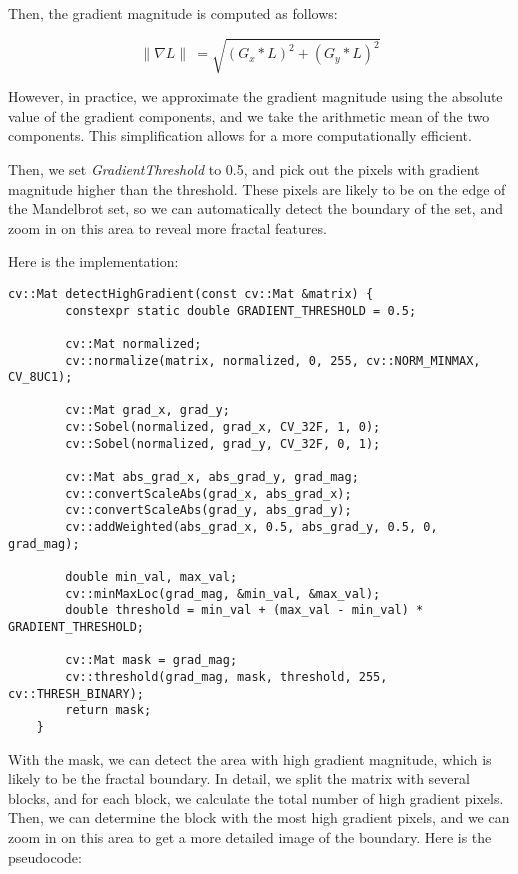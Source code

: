 Then, the gradient magnitude is computed as follows:

\begin{equation}
    \label{eq:gradient_magnitude}
    \parallel \nabla L \parallel \ = \sqrt{(G_x * L)^2 + (G_y * L)^2}
\end{equation}

However, in practice, we approximate the gradient magnitude using the absolute value of the gradient components, and
we take the arithmetic mean of the two components.
This simplification allows for a more computationally efficient.

Then, we set \textit{GradientThreshold}
to 0.5, and pick out the pixels with gradient magnitude higher than the threshold.
These pixels are likely to be on the edge of the Mandelbrot set, so we can automatically detect the boundary of the
set, and zoom in on this area to reveal more fractal features.

Here is the implementation:

\begin{lstlisting}[label={lst:detect_high_gradient}, gobble=4]
    cv::Mat detectHighGradient(const cv::Mat &matrix) {
        constexpr static double GRADIENT_THRESHOLD = 0.5;

        cv::Mat normalized;
        cv::normalize(matrix, normalized, 0, 255, cv::NORM_MINMAX, CV_8UC1);

        cv::Mat grad_x, grad_y;
        cv::Sobel(normalized, grad_x, CV_32F, 1, 0);
        cv::Sobel(normalized, grad_y, CV_32F, 0, 1);

        cv::Mat abs_grad_x, abs_grad_y, grad_mag;
        cv::convertScaleAbs(grad_x, abs_grad_x);
        cv::convertScaleAbs(grad_y, abs_grad_y);
        cv::addWeighted(abs_grad_x, 0.5, abs_grad_y, 0.5, 0, grad_mag);

        double min_val, max_val;
        cv::minMaxLoc(grad_mag, &min_val, &max_val);
        double threshold = min_val + (max_val - min_val) * GRADIENT_THRESHOLD;

        cv::Mat mask = grad_mag;
        cv::threshold(grad_mag, mask, threshold, 255, cv::THRESH_BINARY);
        return mask;
    }
\end{lstlisting}

With the mask, we can detect the area with high gradient magnitude, which is likely to be the fractal boundary.
In detail, we split the matrix with several blocks, and for each block, we calculate the total number of high
gradient pixels.
Then, we can determine the block with the most high gradient pixels, and we can zoom in on this area to get a more
detailed image of the boundary.
Here is the pseudocode:


